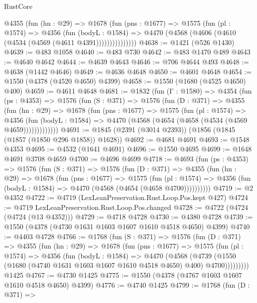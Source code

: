 \begin{lexlean}{RustCore}
\begin{coremodule}
            @4355
              (fun (hn : @29) =>
              @1678
                (fun (pns : @1677) =>
                @1575
                  (fun (pl : @1574) =>
                  @4356
                    (fun (bodyL : @1584) =>
                    @4470 (@4568 (@4606 (@4610 (@4534 (@4569 (@4611 @4391)))))))))))))))
@4638 := @1421 (@526 @1430)
@4639 := @483 @1058
@4640 := @483 @730
@4642 := @483 @1470 @489
@4643 := @4640 @4642
@4644 := @4639 @4643
@4646 := @706 @4644 @493
@4648 := @4638 (@1442 @4646)
@4649 := @4636 @4648
@4650 := @4601 @4648
@4654 := @1550 (@4378 (@4520 @4650) @4399)
@4658 := @1550 (@1680 (@4525 @4650) @400)
@4659 := @4611 @4648
@4681 := @1832
    (fun (Γ : @1580) =>
    @4354
      (fun (ps : @4353) =>
      @1576
        (fun (S : @371) =>
        @1576
          (fun (D : @371) =>
          @4355
            (fun (hn : @29) =>
            @1678
              (fun (pns : @1677) =>
              @1575
                (fun (pl : @1574) =>
                @4356
                  (fun (bodyL : @1584) =>
                  @4470 (@4568 (@4654 (@4658 (@4534 (@4569 @4659)))))))))))))
@4691 := @1845 (@2391 (@3014 @2393)) (@1856 (@1845 (@1857 (@1850 @296 @1858)) @1628))
@4692 := @4681 @4691
@4693 := @1548 @4353
@4695 := @4532 (@1641 @4691)
@4696 := @1550 @4695
@4699 := @1648 @4691 @3708 @4659
@4700 := @4696 @4699
@4718 := @4693
    (fun (ps : @4353) =>
    @1576
      (fun (S : @371) =>
      @1576
        (fun (D : @371) =>
        @4355
          (fun (hn : @29) =>
          @1678
            (fun (pns : @1677) =>
            @1575
              (fun (pl : @1574) =>
              @4356 (fun (bodyL : @1584) => @4470 (@4568 (@4654 (@4658 @4700))))))))))
@4719 := @2 @4352
@4722 := @4719 (LexLeanPreservation.Rust.Loop.Pos.kept @427)
@4724 := @4719 LexLeanPreservation.Rust.Loop.Pos.changed
@4728 := @4722 (@4724 (@4724 (@13 @4352)))
@4729 := @4718 @4728
@4730 := @4380 @4728
@4739 := @1550 (@4378 (@4730 @1631 @1603 @1607 @1610 @4518 @4650) @4399)
@4740 := @4403 @4728
@4766 := @1768
    (fun (S : @371) =>
    @1576
      (fun (D : @371) =>
      @4355
        (fun (hn : @29) =>
        @1678
          (fun (pns : @1677) =>
          @1575
            (fun (pl : @1574) =>
            @4356
              (fun (bodyL : @1584) =>
              @4470
                (@4568
                  (@4739
                    (@1550 (@1680 (@4740 @1631 @1603 @1607 @1610 @4518 @4650) @400) @4700)))))))))
    @1425
@4767 := @4730 @1425
@4775 := @1550 (@4378 (@4767 @1603 @1607 @1610 @4518 @4650) @4399)
@4776 := @4740 @1425
@4799 := @1768
    (fun (D : @371) =>

\end{coremodule}
\end{lexlean}

